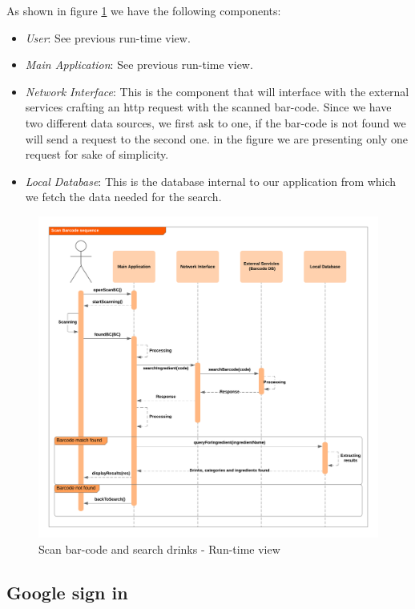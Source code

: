 \documentclass[paper=a4, fontsize=12pt]{scrartcl}
\numberwithin{equation}{section}		%
\numberwithin{figure}{section}			%
\numberwithin{table}{section}				%
\begin{document}
As shown in figure \ref{Scan barcode rt} we have the following components:
\begin{itemize}
    \item \textit{User}: See previous run-time view.
    \item \textit{Main Application}: See previous run-time view.
    \item \textit{Network Interface}: This is the component that will interface with the external services crafting an http request with the scanned bar-code. Since we have two different data sources, we first ask to one, if the bar-code is not found we will send a request to the second one. in the figure we are presenting only one request for sake of simplicity.
    \item \textit{Local Database}: This is the database internal to our application from which we fetch the data needed for the search.
\end{itemize}

\begin{figure}[H]
\begin{center}
    \includegraphics[width=\textwidth]{RunTime/ScanBarcode.png}
    \caption{Scan bar-code and search drinks - Run-time view}
    \label{Scan barcode rt}
\end{center}
\end{figure}

\subsection{Google sign in}
\end{document}

